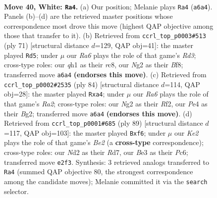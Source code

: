 \documentclass[11pt]{article}
\begin{document}
\clearpage

\begin{figure}[p]\centering
\begin{subfigure}{0.46\textwidth}\centering
\resizebox{\linewidth}{!}{%
\newchessgame
\chessboard[
  setfen={1r4k1/1rn2pb1/R7/2Q1p3/4P3/4Bn2/3NKRN1/7q w - - 4 40},
  showmover=false,
  pgfstyle=straightmove, color=movearrow, markmove={a6-a4}
]}
\caption{}
\end{subfigure}\hfill
\begin{subfigure}{0.46\textwidth}\centering
\resizebox{\linewidth}{!}{%
\newchessgame
\chessboard[
  setfen={1NR2b2/B2n1k1p/3r4/4p1p1/bpN5/5P2/1P3KPP/8 b - - 7 36},
  showmover=false,
  pgfstyle=straightmove, color=movearrow, markmove={d6-d5}
]}
\caption{}
\end{subfigure}
\\[4pt]
\begin{subfigure}{0.46\textwidth}\centering
\resizebox{\linewidth}{!}{%
\newchessgame
\chessboard[
  setfen={7b/5p1k/2r1rnpp/3Np3/qP2P3/7P/R4RBK/8 w - - 0 43},
  showmover=false,
  pgfstyle=straightmove, color=movearrow, markmove={a2-a4}
]}
\caption{}
\end{subfigure}\hfill
\begin{subfigure}{0.46\textwidth}\centering
\resizebox{\linewidth}{!}{%
\newchessgame
\chessboard[
  setfen={5r2/3rb3/2p2Nk1/3nB1p1/P7/1P3R1P/K1P3P1/4R3 b - - 0 45},
  showmover=false,
  pgfstyle=straightmove, color=movearrow, markmove={e7-f6}
]}
\caption{}
\end{subfigure}
\caption{\textbf{Move 40, White: \texttt{Ra4}.} (a) Our position; Melanie plays \texttt{Ra4} (\texttt{a6a4}). Panels (b)--(d) are the retrieved master positions whose correspondence most drove this move (highest QAP objective among those that transfer to it). (b) Retrieved from \texttt{ccrl\_top\_p0003\#513} (ply 71) [structural distance $d$=129, QAP obj=41]: the master played \texttt{Rd5}; under $\mu$ our \emph{Ra6} plays the role of that game's \emph{Rd3}; cross-type roles: our \emph{q}h1 as their \emph{r}c8, our \emph{N}g2 as their \emph{B}f8; transferred move \texttt{a6a4} \textbf{(endorses this move)}. (c) Retrieved from \texttt{ccrl\_top\_p0002\#2535} (ply 84) [structural distance $d$=114, QAP obj=28]: the master played \texttt{Rxa4}; under $\mu$ our \emph{Ra6} plays the role of that game's \emph{Ra2}; cross-type roles: our \emph{N}g2 as their \emph{R}f2, our \emph{P}e4 as their \emph{B}g2; transferred move \texttt{a6a4} \textbf{(endorses this move)}. (d) Retrieved from \texttt{ccrl\_top\_p0001\#685} (ply 89) [structural distance $d$=117, QAP obj=103]: the master played \texttt{Bxf6}; under $\mu$ our \emph{Ke2} plays the role of that game's \emph{Be2} (a \textbf{cross-type} correspondence); cross-type roles: our \emph{N}d2 as their \emph{R}d7, our \emph{B}e3 as their \emph{P}c6; transferred move \texttt{e2f3}. Synthesis: 3 retrieved analogs transferred to \texttt{Ra4} (summed QAP objective 80, the strongest correspondence among the candidate moves); Melanie committed it via the \texttt{search} selector.}
\label{fig:thought-m78}
\end{figure}
\end{document}
